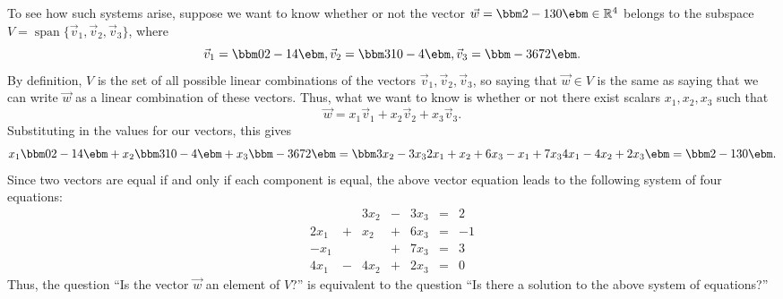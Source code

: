 To see how such systems arise, suppose we want to know whether or not the vector $\vec w = \bbm 2\\-1\\3\\0\ebm \in\mathbb{R}^4$ belongs to the subspace $V = \operatorname{span}\{\vec{v}_1, \vec{v}_2, \vec{v}_3\}$, where
\[
\vec{v}_1 = \bbm 0\\2\\-1\\4\ebm, \vec{v}_2 = \bbm 3\\1\\0\\-4\ebm, \vec{v}_3 = \bbm -3\\6\\7\\2\ebm.
\]
By definition, $V$ is the set of all possible linear combinations of the vectors $\vec{v}_1, \vec{v}_2, \vec{v}_3$, so saying that $\vec w \in V$ is the same as saying that we can write $\vec w$ as a linear combination of these vectors. Thus, what we want to know is whether or not there exist scalars $x_1, x_2, x_3$ such that
\[
\vec w = x_1\vec{v}_1 + x_2\vec{v}_2 + x_3\vec{v}_3.
\]
Substituting in the values for our vectors, this gives
\[
x_1\bbm 0\\2\\-1\\4\ebm + x_2\bbm 3\\1\\0\\-4\ebm + x_3\bbm -3\\6\\7\\2\ebm  = \bbm 3x_2-3x_3\\2x_1+x_2+6x_3\\-x_1+7x_3\\4x_1-4x_2+2x_3\ebm = \bbm 2\\-1\\3\\0\ebm .
\]
Since two vectors are equal if and only if each component is equal, the above vector equation leads to the following system of four equations:
\[
\begin{array}{ccccccc}
 & &3x_2&-&3x_3&=&2\\
2x_1&+&x_2&+&6x_3&=&-1\\
-x_1& & &+&7x_3&=&3\\
4x_1&-&4x_2&+&2x_3&=&0
\end{array}
\]
Thus, the question ``Is the vector $\vec w$ an element of $V$?'' is equivalent to the question ``Is there a solution to the above system of equations?'' 

